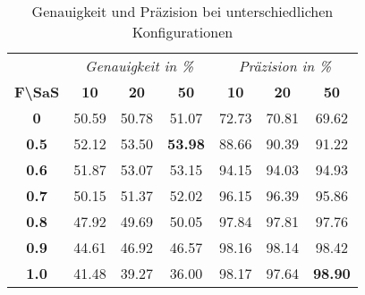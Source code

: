 \begin{table}[h]
    \centering
    \begin{tabular}{ c | c c c | c c c }
        &   \multicolumn{3}{c}{\textit{Genauigkeit in \%}}    &   \multicolumn{3}{c}{\textit{Präzision in \%}} \\
        \textbf{F\textbackslash SaS} & \textbf{10} & \textbf{20} & \textbf{50} & \textbf{10} & \textbf{20} & \textbf{50}  \\
        \hline
        \textbf{0}       &   50.59 &   50.78 &   51.07         &   72.73 &   70.81 &   69.62 \\
        \textbf{0.5}     &   52.12 &   53.50 &   \textbf{53.98}&   88.66 &   90.39 &   91.22 \\
        \textbf{0.6}     &   51.87 &   53.07 &   53.15         &   94.15 &   94.03 &   94.93 \\
        \textbf{0.7}     &   50.15 &   51.37 &   52.02         &   96.15 &   96.39 &   95.86 \\
        \textbf{0.8}     &   47.92 &   49.69 &   50.05         &   97.84 &   97.81 &   97.76 \\
        \textbf{0.9}     &   44.61 &   46.92 &   46.57         &   98.16 &   98.14 &   98.42 \\
        \textbf{1.0}     &   41.48 &   39.27 &   36.00         &   98.17 &   97.64 &   \textbf{98.90}

    \end{tabular}
    \caption{Genauigkeit und Präzision bei unterschiedlichen Konfigurationen}
    \label{tab:accuracy-precision}
\end{table}

